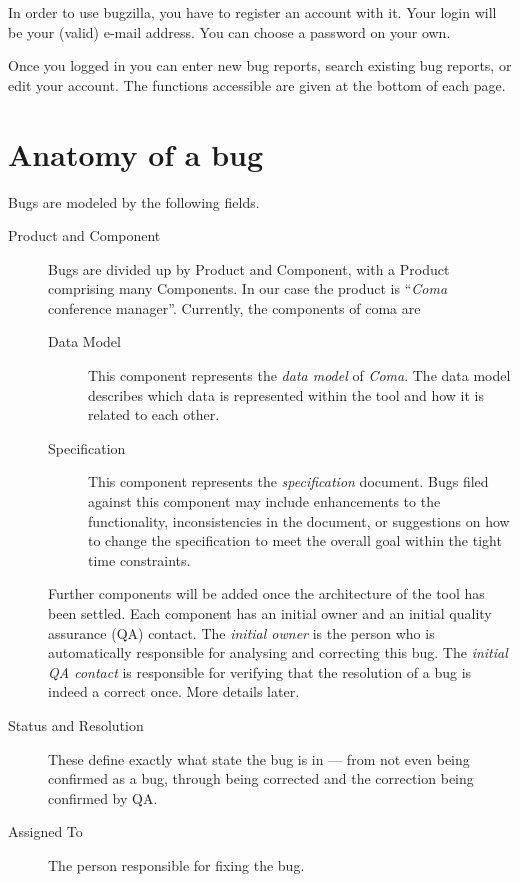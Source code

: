 \documentclass[11pt,nologo,handout]{handout}
\newcommand{\Coma}{\textsl{Coma}}
\begin{document}
In order to use bugzilla, you have to register an account with it.
Your login will be your (valid) e-mail address.  You can choose a
password on your own.

Once you logged in you can enter new bug reports, search existing bug
reports, or edit your account.  The functions accessible are given at
the bottom of each page.







\section{Anatomy of a bug}

Bugs are modeled by the following fields.
\begin{description}
\item[Product and Component]  Bugs are divided up by Product and Component,
  with a Product comprising many Components.  In our case the product is
  ``{\Coma} conference manager''.  Currently, the components of coma are
  \begin{description}
  \item[Data Model]  This component represents the \emph{data model} of
    {\Coma}.  The data model describes which data is represented within
    the tool and how it is related to each other.
  \item[Specification]  This component represents the \emph{specification}
    document.  Bugs filed against this component may include enhancements
    to the functionality, inconsistencies in the document, or suggestions
    on how to change the specification to meet the overall goal within the
    tight time constraints.
  \end{description}
  Further components will be added once the architecture of the tool has
  been settled.  Each component has an initial owner and an
  initial quality assurance (QA) contact.  The \emph{initial owner}
  is the person who is automatically responsible for analysing and
  correcting this bug.  The \emph{initial QA contact} is responsible
  for verifying that the resolution of a bug is indeed a correct once.
  More details later.
\item[Status and Resolution]  These define exactly what state the bug is in
  --- from not even being confirmed as a bug, through being corrected and
  the correction being confirmed by QA.
\item[Assigned To]  The person responsible for fixing the bug.

\end{description}
\end{document}
